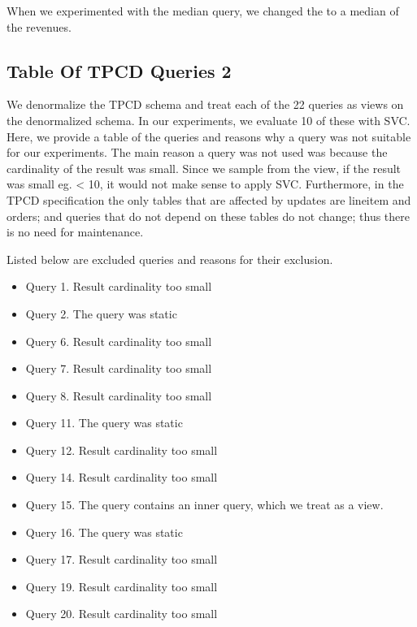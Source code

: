 When we experimented with the median query, we changed the \sumfunc to a median of the revenues.

\subsection{Table Of TPCD Queries 2}
We denormalize the TPCD schema and treat each of the 22 queries as views on the denormalized schema.
In our experiments, we evaluate 10 of these with SVC. 
Here, we provide a table of the queries and reasons why a query was not suitable for our experiments.
The main reason a query was not used was because the cardinality of the result was small.
Since we sample from the view, if the result was small eg. < 10, it would not make sense to apply SVC.
Furthermore, in the TPCD specification the only tables that are affected by updates are lineitem and orders; and queries that
do not depend on these tables do not change; thus there is no need for maintenance.

Listed below are excluded queries and reasons for their exclusion.
\begin{itemize}
\item Query 1. Result cardinality too small
\item Query 2. The query was static
\item Query 6. Result cardinality too small
\item Query 7. Result cardinality too small
\item Query 8. Result cardinality too small
\item Query 11. The query was static 
\item Query 12. Result cardinality too small
\item Query 14. Result cardinality too small
\item Query 15. The query contains an inner query, which we treat as a view.
\item Query 16. The query was static 
\item Query 17. Result cardinality too small
\item Query 19. Result cardinality too small
\item Query 20. Result cardinality too small
\end{itemize}

